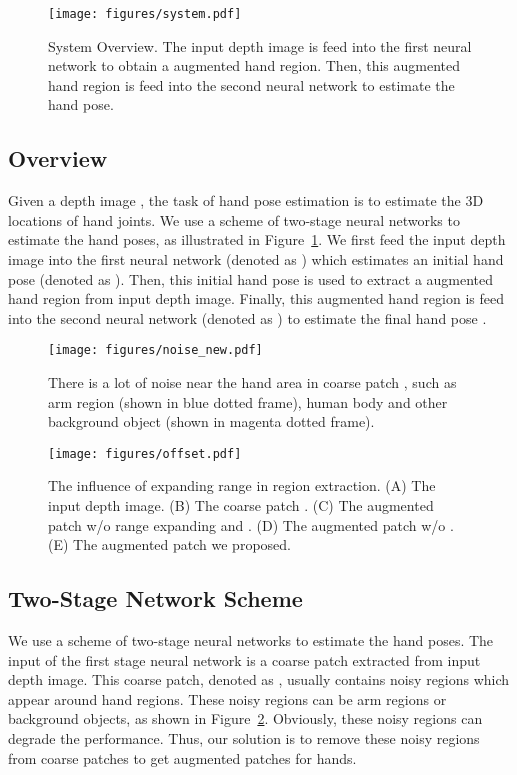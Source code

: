 \documentclass{article}
\begin{document}
\begin{figure}[t]
	\centering
	\texttt{[image: figures/system.pdf]}
	\caption{System Overview. The input depth image is feed into the first neural network  to obtain a augmented hand region. Then, this augmented hand region is feed into the second neural network  to estimate the hand pose.}
	\label{fig:overview} 
\end{figure}
\subsection{Overview}\label{sec:overview}
Given a depth image , the task of hand pose estimation is to estimate the 3D locations  of  hand joints. We use a scheme of two-stage neural networks to estimate the hand poses, as illustrated in Figure~\ref{fig:overview}.
We first feed the input depth image into the first neural network (denoted as ) which estimates an initial hand pose (denoted as ). 
Then, this initial hand pose  is used to extract a augmented hand region from input depth image.
Finally, this augmented hand region is feed into the second neural network (denoted as ) to estimate the final hand pose . 



\begin{figure}[t]
	\centering
	\texttt{[image: figures/noise\_new.pdf]}
	\caption{There is a lot of noise near the hand area in coarse patch , such as arm region (shown in blue dotted frame), human body and other background object (shown in magenta dotted frame).}
	\label{fig:noise} 
\end{figure}


\begin{figure}[t]
	\centering
	\texttt{[image: figures/offset.pdf]}
	\caption{The influence of expanding range in region extraction. (A) The input depth image. (B) The coarse patch . (C) The augmented patch w/o range expanding and  . (D) The augmented patch w/o . (E) The augmented patch we proposed.}
	\label{fig:offset} 
\end{figure}


\subsection{Two-Stage Network Scheme}\label{sec:net}
We use a scheme of two-stage neural networks to estimate the hand poses. The input of the first stage neural network is a coarse patch extracted from input depth image.
This coarse patch, denoted as , usually contains noisy regions which appear around hand regions. These noisy regions can be arm regions or background objects, as shown in Figure~\ref{fig:noise}. Obviously, these noisy regions can degrade the performance. Thus, our solution is to remove these noisy regions from coarse patches to get augmented patches for hands.
\end{document}
